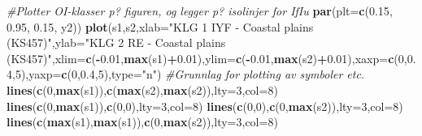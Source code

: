 \documentclass[]{article}
\newenvironment{Shaded}{\begin{snugshade}}{\end{snugshade}}
\newcommand{\CommentTok}[1]{\textcolor[rgb]{0.56,0.35,0.01}{\textit{#1}}}
\newcommand{\DataTypeTok}[1]{\textcolor[rgb]{0.13,0.29,0.53}{#1}}
\newcommand{\DecValTok}[1]{\textcolor[rgb]{0.00,0.00,0.81}{#1}}
\newcommand{\FloatTok}[1]{\textcolor[rgb]{0.00,0.00,0.81}{#1}}
\newcommand{\KeywordTok}[1]{\textcolor[rgb]{0.13,0.29,0.53}{\textbf{#1}}}
\newcommand{\NormalTok}[1]{#1}
\newcommand{\OperatorTok}[1]{\textcolor[rgb]{0.81,0.36,0.00}{\textbf{#1}}}
\newcommand{\StringTok}[1]{\textcolor[rgb]{0.31,0.60,0.02}{#1}}
\begin{document}
\begin{Shaded}
\begin{Highlighting}[]
  \CommentTok{#Plotter OI-klasser p? figuren, og legger p? isolinjer for IfIu}
  \KeywordTok{par}\NormalTok{(}\DataTypeTok{plt=}\KeywordTok{c}\NormalTok{(}\FloatTok{0.15}\NormalTok{, }\FloatTok{0.95}\NormalTok{, }\FloatTok{0.15}\NormalTok{, y2))}
\KeywordTok{plot}\NormalTok{(s1,s2,}\DataTypeTok{xlab=}\StringTok{"KLG 1 IYF - Coastal plains (KS457)"}\NormalTok{,}\DataTypeTok{ylab=}\StringTok{"KLG 2 RE - Coastal plains (KS457)"}\NormalTok{,}\DataTypeTok{xlim=}\KeywordTok{c}\NormalTok{(}\OperatorTok{-}\FloatTok{0.01}\NormalTok{,}\KeywordTok{max}\NormalTok{(s1)}\OperatorTok{+}\FloatTok{0.01}\NormalTok{),}\DataTypeTok{ylim=}\KeywordTok{c}\NormalTok{(}\OperatorTok{-}\FloatTok{0.01}\NormalTok{,}\KeywordTok{max}\NormalTok{(s2)}\OperatorTok{+}\FloatTok{0.01}\NormalTok{),}\DataTypeTok{xaxp=}\KeywordTok{c}\NormalTok{(}\DecValTok{0}\NormalTok{,}\FloatTok{0.4}\NormalTok{,}\DecValTok{5}\NormalTok{),}\DataTypeTok{yaxp=}\KeywordTok{c}\NormalTok{(}\DecValTok{0}\NormalTok{,}\FloatTok{0.4}\NormalTok{,}\DecValTok{5}\NormalTok{),}\DataTypeTok{type=}\StringTok{"n"}\NormalTok{) }\CommentTok{#Grunnlag for plotting av symboler etc.}
\KeywordTok{lines}\NormalTok{(}\KeywordTok{c}\NormalTok{(}\DecValTok{0}\NormalTok{,}\KeywordTok{max}\NormalTok{(s1)),}\KeywordTok{c}\NormalTok{(}\KeywordTok{max}\NormalTok{(s2),}\KeywordTok{max}\NormalTok{(s2)),}\DataTypeTok{lty=}\DecValTok{3}\NormalTok{,}\DataTypeTok{col=}\DecValTok{8}\NormalTok{)}
\KeywordTok{lines}\NormalTok{(}\KeywordTok{c}\NormalTok{(}\DecValTok{0}\NormalTok{,}\KeywordTok{max}\NormalTok{(s1)),}\KeywordTok{c}\NormalTok{(}\DecValTok{0}\NormalTok{,}\DecValTok{0}\NormalTok{),}\DataTypeTok{lty=}\DecValTok{3}\NormalTok{,}\DataTypeTok{col=}\DecValTok{8}\NormalTok{)}
\KeywordTok{lines}\NormalTok{(}\KeywordTok{c}\NormalTok{(}\DecValTok{0}\NormalTok{,}\DecValTok{0}\NormalTok{),}\KeywordTok{c}\NormalTok{(}\DecValTok{0}\NormalTok{,}\KeywordTok{max}\NormalTok{(s2)),}\DataTypeTok{lty=}\DecValTok{3}\NormalTok{,}\DataTypeTok{col=}\DecValTok{8}\NormalTok{)}
\KeywordTok{lines}\NormalTok{(}\KeywordTok{c}\NormalTok{(}\KeywordTok{max}\NormalTok{(s1),}\KeywordTok{max}\NormalTok{(s1)),}\KeywordTok{c}\NormalTok{(}\DecValTok{0}\NormalTok{,}\KeywordTok{max}\NormalTok{(s2)),}\DataTypeTok{lty=}\DecValTok{3}\NormalTok{,}\DataTypeTok{col=}\DecValTok{8}\NormalTok{)}


\end{Highlighting}
\end{Shaded}
\end{document}
